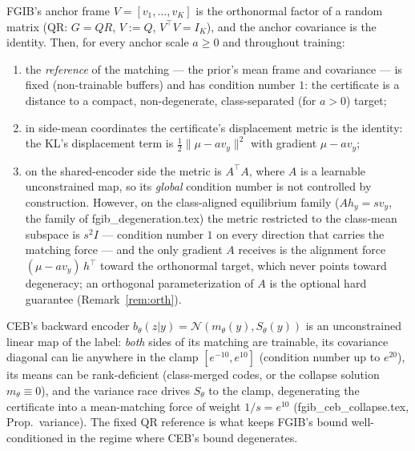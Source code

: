\begin{proposition}\label{prop:conditioning}
FGIB's anchor frame $V = [v_1, \dots, v_K]$ is the orthonormal factor of a random matrix
(QR: $G = QR$, $V := Q$, $V^{\top}V = I_K$), and the anchor covariance is the identity.
Then, for every anchor scale $a \ge 0$ and throughout training:
\begin{enumerate}
\item[(i)] the \emph{reference} of the matching --- the prior's mean frame and
covariance --- is fixed (non-trainable buffers) and has condition number $1$: the
certificate is a distance to a compact, non-degenerate, class-separated (for $a > 0$)
target;
\item[(ii)] in side-mean coordinates the certificate's displacement metric is the
identity: the KL's displacement term is $\tfrac12\|\mu - a v_y\|^2$ with gradient
$\mu - a v_y$;
\item[(iii)] on the shared-encoder side the metric is $A^{\top}A$, where $A$ is a
learnable unconstrained map, so its \emph{global} condition number is not controlled by
construction. However, on the class-aligned equilibrium family ($A h_y = s v_y$, the
family of fgib\_degeneration.tex) the metric restricted to the class-mean subspace is
$s^2 I$ --- condition number $1$ on every direction that carries the matching force ---
and the only gradient $A$ receives is the alignment force
$(\mu - a v_y)\,h^{\top}$ toward the orthonormal target, which never points toward
degeneracy; an orthogonal parameterization of $A$ is the optional hard guarantee
(Remark~\ref{rem:orth}).
\end{enumerate}
CEB's backward encoder $b_\theta(z|y) = \mathcal{N}(m_\theta(y), S_\theta(y))$ is an
unconstrained linear map of the label: \emph{both} sides of its matching are trainable,
its covariance diagonal can lie anywhere in the clamp $[e^{-10}, e^{10}]$ (condition
number up to $e^{20}$), its means can be rank-deficient (class-merged codes, or the
collapse solution $m_\theta \equiv 0$), and the variance race drives $S_\theta$ to the
clamp, degenerating the certificate into a mean-matching force of weight $1/s = e^{10}$
(fgib\_ceb\_collapse.tex, Prop.~variance). The fixed QR reference is what keeps FGIB's
bound well-conditioned in the regime where CEB's bound degenerates.
\end{proposition}

